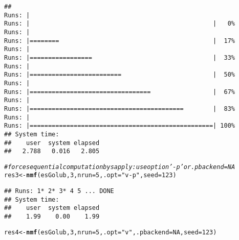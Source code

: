 \documentclass[a4paper]{article}\usepackage[]{graphicx}\usepackage[]{color}
\makeatletter
\newcommand{\hlnum}[1]{\textcolor[rgb]{0.686,0.059,0.569}{#1}}%
\newcommand{\hlstr}[1]{\textcolor[rgb]{0.192,0.494,0.8}{#1}}%
\newcommand{\hlcom}[1]{\textcolor[rgb]{0.678,0.584,0.686}{\textit{#1}}}%
\newcommand{\hlstd}[1]{\textcolor[rgb]{0.345,0.345,0.345}{#1}}%
\newcommand{\hlkwb}[1]{\textcolor[rgb]{0.69,0.353,0.396}{#1}}%
\newcommand{\hlkwc}[1]{\textcolor[rgb]{0.333,0.667,0.333}{#1}}%
\newcommand{\hlkwd}[1]{\textcolor[rgb]{0.737,0.353,0.396}{\textbf{#1}}}%
\newenvironment{kframe}{%
 \def\at@end@of@kframe{}%
 \ifinner\ifhmode%
  \def\at@end@of@kframe{\end{minipage}}%
  \begin{minipage}{\columnwidth}%
 \fi\fi%
 \def\FrameCommand##1{\hskip\@totalleftmargin \hskip-\fboxsep
 \colorbox{shadecolor}{##1}\hskip-\fboxsep
     \hskip-\linewidth \hskip-\@totalleftmargin \hskip\columnwidth}%
 \MakeFramed {\advance\hsize-\width
   \@totalleftmargin\z@ \linewidth\hsize
   \@setminipage}}%
 {\par\unskip\endMakeFramed%
 \at@end@of@kframe}
\newenvironment{knitrout}{}{} %
\makeatother
\begin{document}
\begin{knitrout}
\begin{kframe}
{\ttfamily\noindent\itshape\color{messagecolor}{\#\# NMF algorithm: 'brunet'\\\#\# Multiple runs: 5\\\#\# Mode: sequential [foreach:doParallelMC]}}\begin{verbatim}
## 
Runs: |                                                        
Runs: |                                                  |   0%
Runs: |                                                        
Runs: |========                                          |  17%
Runs: |                                                        
Runs: |=================                                 |  33%
Runs: |                                                        
Runs: |=========================                         |  50%
Runs: |                                                        
Runs: |=================================                 |  67%
Runs: |                                                        
Runs: |==========================================        |  83%
Runs: |                                                        
Runs: |==================================================| 100%
## System time:
##    user  system elapsed 
##   2.788   0.016   2.805
\end{verbatim}
\begin{alltt}
\hlcom{# force sequential computation by sapply: use option '-p' or .pbackend=NA}
\hlstd{res3} \hlkwb{<-} \hlkwd{nmf}\hlstd{(esGolub,} \hlnum{3}\hlstd{,} \hlkwc{nrun} \hlstd{=} \hlnum{5}\hlstd{,} \hlkwc{.opt} \hlstd{=} \hlstr{"v-p"}\hlstd{,} \hlkwc{seed} \hlstd{=} \hlnum{123}\hlstd{)}
\end{alltt}


{\ttfamily\noindent\itshape\color{messagecolor}{\#\# NMF algorithm: 'brunet'\\\#\# Multiple runs: 5\\\#\# Mode: sequential [sapply]}}\begin{verbatim}
## Runs: 1* 2* 3* 4 5 ... DONE
## System time:
##    user  system elapsed 
##    1.99    0.00    1.99
\end{verbatim}
\begin{alltt}
\hlstd{res4} \hlkwb{<-} \hlkwd{nmf}\hlstd{(esGolub,} \hlnum{3}\hlstd{,} \hlkwc{nrun} \hlstd{=} \hlnum{5}\hlstd{,} \hlkwc{.opt} \hlstd{=} \hlstr{"v"}\hlstd{,} \hlkwc{.pbackend} \hlstd{=} \hlnum{NA}\hlstd{,} \hlkwc{seed} \hlstd{=} \hlnum{123}\hlstd{)}
\end{alltt}



\end{kframe}
\end{knitrout}
\end{document}
